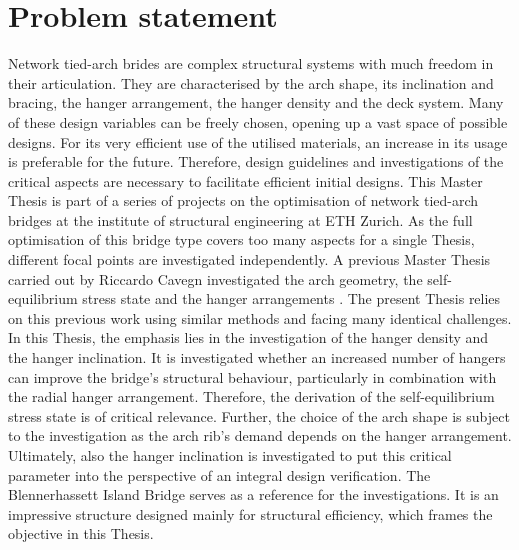 \section{Problem statement} \label{sec:int_prob}
Network tied-arch brides are complex structural systems with much freedom in their articulation.
They are characterised by the arch shape, its inclination and bracing, the hanger arrangement, the hanger density and the deck system. Many of these design variables can be freely chosen, opening up a vast space of possible designs. 
For its very efficient use of the utilised materials, an increase in its usage is preferable for the future. Therefore, design guidelines and investigations of the critical aspects are necessary to facilitate efficient initial designs.
This Master Thesis is part of a series of projects on the optimisation of network tied-arch bridges at the institute of structural engineering at ETH Zurich. As the full optimisation of this bridge type covers too many aspects for a single Thesis, different focal points are investigated independently. A previous Master Thesis carried out by Riccardo Cavegn investigated the arch geometry, the self-equilibrium stress state and the hanger arrangements \cite{Cavegn}. 
The present Thesis relies on this previous work using similar methods and facing many identical challenges.
In this Thesis, the emphasis lies in the investigation of the hanger density and the hanger inclination. It is investigated whether an increased number of hangers can improve the bridge's structural behaviour, particularly in combination with the radial hanger arrangement. Therefore, the derivation of the self-equilibrium stress state is of critical relevance. Further, the choice of the arch shape is subject to the investigation as the arch rib's demand depends on the hanger arrangement. Ultimately, also the hanger inclination is investigated to put this critical parameter into the perspective of an integral design verification.
The Blennerhassett Island Bridge serves as a reference for the investigations. It is an impressive structure designed mainly for structural efficiency, which frames the objective in this Thesis.  

